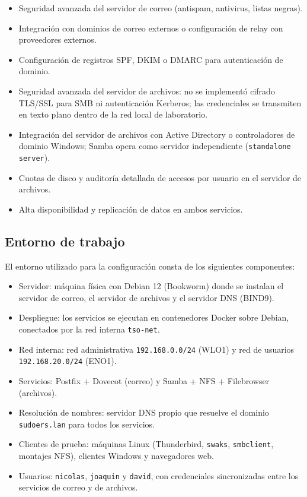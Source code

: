 \begin{itemize}
  \item Seguridad avanzada del servidor de correo (antispam, antivirus,
        listas negras).
  \item Integración con dominios de correo externos o configuración de relay
        con proveedores externos.
  \item Configuración de registros SPF, DKIM o DMARC para autenticación de
        dominio.
  \item Seguridad avanzada del servidor de archivos: no se implementó cifrado
        TLS/SSL para SMB ni autenticación Kerberos; las credenciales se
        transmiten en texto plano dentro de la red local de laboratorio.
  \item Integración del servidor de archivos con Active Directory o
        controladores de dominio Windows; Samba opera como servidor
        independiente (\texttt{standalone server}).
  \item Cuotas de disco y auditoría detallada de accesos por usuario en el
        servidor de archivos.
  \item Alta disponibilidad y replicación de datos en ambos servicios.
\end{itemize}

\subsection{Entorno de trabajo}

El entorno utilizado para la configuración consta de los siguientes
componentes:

\begin{itemize}
  \item Servidor: máquina física con Debian 12 (Bookworm) donde se
        instalan el servidor de correo, el servidor de archivos y el servidor
        DNS (BIND9).
  \item Despliegue: los servicios se ejecutan en contenedores Docker
        sobre Debian, conectados por la red interna \texttt{tso-net}.
  \item Red interna: red administrativa \texttt{192.168.0.0/24}
        (WLO1) y red de usuarios \texttt{192.168.20.0/24} (ENO1).
  \item Servicios: Postfix + Dovecot (correo) y Samba + NFS +
        Filebrowser (archivos).
  \item Resolución de nombres: servidor DNS propio que resuelve el
        dominio \texttt{sudoers.lan} para todos los servicios.
  \item Clientes de prueba: máquinas Linux (Thunderbird,
        \texttt{swaks}, \texttt{smbclient}, montajes NFS), clientes Windows y
        navegadores web.
  \item Usuarios: \texttt{nicolas}, \texttt{joaquin} y
        \texttt{david}, con credenciales sincronizadas entre los servicios
        de correo y de archivos.
\end{itemize}